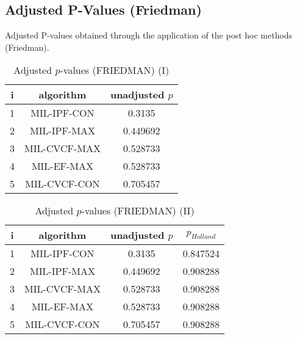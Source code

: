 \documentclass[a4paper,10pt]{article}
\begin{document}
\begin{landscape}
\newpage

\section{Adjusted P-Values (Friedman)}


Adjusted P-values obtained through the application of the post hoc methods (Friedman).

\begin{table}[!htp]
\centering\small
\begin{tabular}{ccc}
i&algorithm&unadjusted $p$\\
\hline1&MIL-IPF-CON&0.3135\\2&MIL-IPF-MAX&0.449692\\3&MIL-CVCF-MAX&0.528733\\4&MIL-EF-MAX&0.528733\\5&MIL-CVCF-CON&0.705457\\\hline
\end{tabular}
\caption{Adjusted $p$-values (FRIEDMAN) (I)}
\end{table}
\begin{table}[!htp]
\centering\small
\begin{tabular}{cccc}
i&algorithm&unadjusted $p$&$p_{Holland}$\\
\hline1&MIL-IPF-CON&0.3135&0.847524\\2&MIL-IPF-MAX&0.449692&0.908288\\3&MIL-CVCF-MAX&0.528733&0.908288\\4&MIL-EF-MAX&0.528733&0.908288\\5&MIL-CVCF-CON&0.705457&0.908288\\\hline
\end{tabular}
\caption{Adjusted $p$-values (FRIEDMAN) (II)}
\end{table}

\newpage
\end{landscape}
\end{document}
